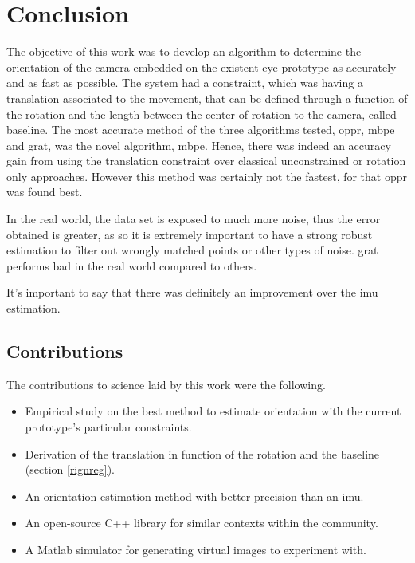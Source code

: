 
\chapter{Conclusion}
\label{conclusion}
The objective of this work was to develop an algorithm to determine the orientation of the camera embedded on the existent eye prototype as accurately and as fast as possible. The system had a constraint, which was having a translation associated to the movement, that can be defined through a function of the rotation and the length between the center of rotation to the camera, called baseline. The most accurate method of the three algorithms tested, \acrshort{oppr}, \acrshort{mbpe} and \acrshort{grat}, was the novel algorithm, \acrshort{mbpe}. Hence, there was indeed an accuracy gain from using the translation constraint over classical unconstrained or rotation only approaches. However this method was certainly not the fastest, for that \acrshort{oppr} was found best.

In the real world, the data set is exposed to much more noise, thus the error obtained is greater, as so it is extremely important to have a strong robust estimation to filter out wrongly matched points or other types of noise. \acrshort{grat} performs bad in the real world compared to others.

It's important to say that there was definitely an improvement over the \acrshort{imu} estimation.

\section{Contributions}
The contributions to science laid by this work were the following.
\begin{itemize}
\item Empirical study on the best method to estimate orientation with the current prototype's particular constraints.

\item Derivation of the translation in function of the rotation and the baseline (section \ref{rignreg}).

\item An orientation estimation method with better precision than an \acrshort{imu}.

\item An open-source C++ library for similar contexts within the community.

\item A Matlab simulator for generating virtual images to experiment with.

\end{itemize}

